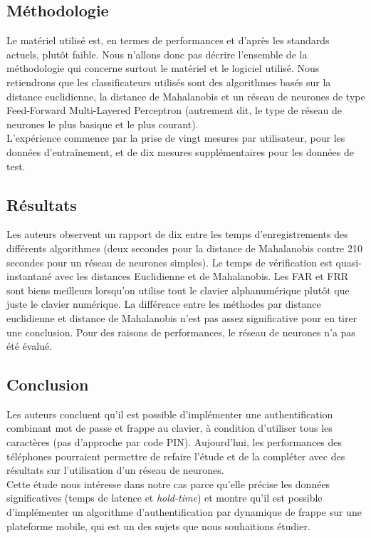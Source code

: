 \subsection{Méthodologie}

Le matériel utilisé est, en termes de performances et d'après les standards actuels, plutôt faible. Nous n'allons donc pas décrire l'ensemble de la méthodologie qui concerne surtout le matériel et le logiciel utilisé. Nous retiendrons que les classificateurs utilisés sont des algorithmes basés sur la distance euclidienne, la distance de Mahalanobis et un réseau de neurones de type Feed-Forward Multi-Layered Perceptron (autrement dit, le type de réseau de neurones le plus basique et le plus courant).\\

L'expérience commence par la prise de vingt mesures par utilisateur, pour les données d'entraînement, et de dix mesures supplémentaires pour les données de test.

\subsection{Résultats}

Les auteurs observent un rapport de dix entre les temps d'enregistrements des différents algorithmes (deux secondes pour la distance de Mahalanobis contre 210 secondes pour un réseau de neurones simples). Le temps de vérification est quasi-instantané avec les distances Euclidienne et de Mahalanobis. Les FAR et FRR sont biens meilleurs lorsqu'on utilise tout le clavier alphanumérique plutôt que juste le clavier numérique. La différence entre les méthodes par distance euclidienne et distance de Mahalanobis n'est pas assez significative pour en tirer une conclusion. Pour des raisons de performances, le réseau de neurones n'a pas été évalué.

\subsection{Conclusion}

Les auteurs concluent qu'il est possible d'implémenter une authentification combinant mot de passe et frappe au clavier, à condition d'utiliser tous les caractères (pas d'approche par code PIN). Aujourd'hui, les performances des téléphones pourraient permettre de refaire l'étude et de la compléter avec des résultats sur l'utilisation d'un réseau de neurones.\\

Cette étude nous intéresse dans notre cas parce qu'elle précise les données significatives (temps de latence et \textit{hold-time}) et montre qu'il est possible d'implémenter un algorithme d'authentification par dynamique de frappe sur une plateforme mobile, qui est un des sujets que nous souhaitions étudier.
